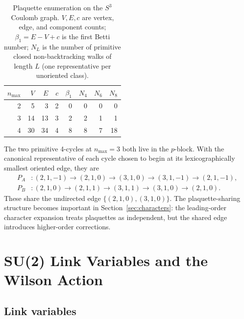 \documentclass[11pt]{article}
\begin{document}
\begin{table}[t]
\centering
\caption{Plaquette enumeration on the $S^3$ Coulomb graph.  $V, E, c$
are vertex, edge, and component counts; $\beta_1 = E - V + c$ is the
first Betti number; $N_L$ is the number of primitive closed
non-backtracking walks of length $L$ (one representative per
unoriented class).}
\label{tab:plaquettes}
\begin{tabular}{rrrrrrrr}
\toprule
$n_{\max}$ & $V$ & $E$ & $c$ & $\beta_1$ & $N_4$ & $N_6$ & $N_8$ \\
\midrule
2 & 5 & 3 & 2 & 0 & 0 & 0 & 0 \\
3 & 14 & 13 & 3 & 2 & 2 & 1 & 1 \\
4 & 30 & 34 & 4 & 8 & 8 & 7 & 18 \\
\bottomrule
\end{tabular}
\end{table}

The two primitive 4-cycles at $n_{\max} = 3$ both live in the
$p$-block.  With the canonical representative of each cycle chosen to
begin at its lexicographically smallest oriented edge, they are
\begin{align}
P_A & : (2, 1, -1) \to (2, 1, 0) \to (3, 1, 0) \to (3, 1, -1) \to (2, 1, -1),
\nonumber\\
P_B & : (2, 1, 0) \to (2, 1, 1) \to (3, 1, 1) \to (3, 1, 0) \to (2, 1, 0).
\label{eq:p_block_plaquettes}
\end{align}
These share the undirected edge $\{(2, 1, 0), (3, 1, 0)\}$.  The
plaquette-sharing structure becomes important in
Section~\ref{sec:characters}: the leading-order character expansion
treats plaquettes as independent, but the shared edge introduces
higher-order corrections.

\section{SU(2) Link Variables and the Wilson Action}
\label{sec:su2}

\subsection{Link variables}
\end{document}
